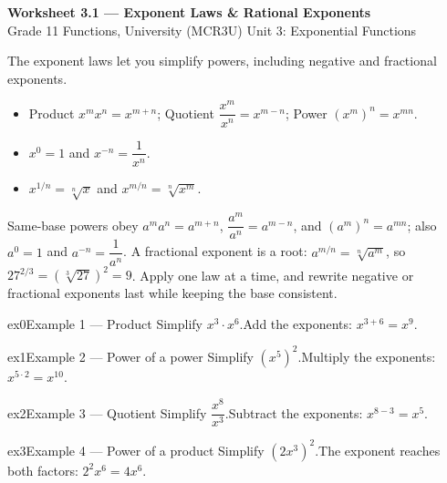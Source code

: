 \documentclass[11pt]{article}
\begin{document}
\begin{center}
{\LARGE\bfseries\color{titleblue}Worksheet 3.1 --- Exponent Laws \& Rational Exponents}\\[2pt]
{\small Grade 11 Functions, University (MCR3U) \textperiodcentered{} Unit 3: Exponential Functions}
\end{center}

\begin{ideabox}
The exponent laws let you simplify powers, including negative and fractional exponents.
\begin{itemize}[leftmargin=*,itemsep=2pt]
  \item Product $x^m x^n=x^{m+n}$; Quotient $\dfrac{x^m}{x^n}=x^{m-n}$; Power $(x^m)^n=x^{mn}$.
  \item $x^0=1$ and $x^{-n}=\dfrac{1}{x^n}$.
  \item $x^{1/n}=\sqrt[n]{x}$ and $x^{m/n}=\sqrt[n]{x^m}$.
\end{itemize}
\end{ideabox}

\begin{learnbox}
Same-base powers obey $a^m a^n=a^{m+n}$, $\dfrac{a^m}{a^n}=a^{m-n}$, and $(a^m)^n=a^{mn}$; also $a^0=1$ and $a^{-n}=\dfrac{1}{a^n}$.
A fractional exponent is a root: $a^{m/n}=\sqrt[n]{a^m}$, so $27^{2/3}=(\sqrt[3]{27})^2=9$.
Apply one law at a time, and rewrite negative or fractional exponents last while keeping the base consistent.
\end{learnbox}


\begin{example}{ex0}{Example 1 --- Product}
Simplify $x^3\cdot x^6$.\soln Add the exponents: $x^{3+6}=x^{9}$.
\end{example}

\begin{example}{ex1}{Example 2 --- Power of a power}
Simplify $(x^5)^2$.\soln Multiply the exponents: $x^{5\cdot2}=x^{10}$.
\end{example}

\begin{example}{ex2}{Example 3 --- Quotient}
Simplify $\dfrac{x^8}{x^3}$.\soln Subtract the exponents: $x^{8-3}=x^{5}$.
\end{example}

\begin{example}{ex3}{Example 4 --- Power of a product}
Simplify $(2x^3)^2$.\soln The exponent reaches both factors: $2^2 x^{6}=4x^{6}$.
\end{example}
\end{document}
